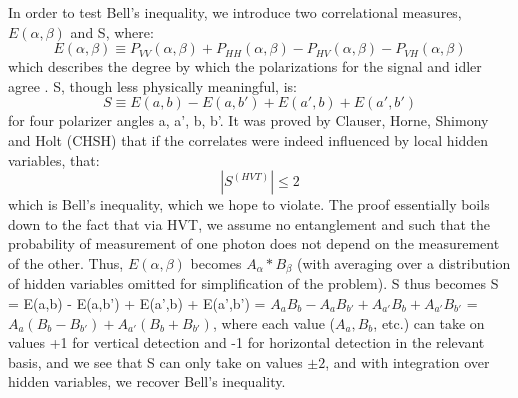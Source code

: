 \documentclass{article}
\begin{document}
    In order to test Bell's inequality, we introduce two correlational measures, $E(\alpha,\beta)$ and S, where:
    \begin{equation}
        E(\alpha,\beta) \equiv P_{VV}(\alpha,\beta) + P_{HH}(\alpha,\beta) - P_{HV}(\alpha,\beta) -  P_{VH}(\alpha,\beta)
    \end{equation}
    which describes the degree by which the polarizations for the signal and idler agree \cite{deh}. S, though less physically meaningful, is: 
    \begin{equation}
        S \equiv E(a,b) - E(a,b') + E(a',b) + E(a',b')
    \end{equation}
    for four polarizer angles a, a', b, b'. It was proved by Clauser, Horne, Shimony and Holt (CHSH) that if the correlates were indeed influenced by local hidden variables, that:
    \begin{equation}
        |S^{(HVT)}| \leq 2
    \end{equation}
    which is Bell's inequality, which we hope to violate. The proof essentially boils down to the fact that via HVT, we assume no entanglement and such that the probability of measurement of one photon does not depend on the measurement of the other. Thus, $E(\alpha,\beta)$ becomes $A_{\alpha}*B_{\beta}$ (with averaging over a distribution of hidden variables omitted for simplification of the problem). S thus becomes S = E(a,b) - E(a,b') + E(a',b) + E(a',b') = $A_a B_b - A_a B_{b'} + A_{a'} B_b + A_{a'} B_{b'}$ = $A_a( B_b - B_{b'}) + A_{a'}(B_b + B_{b'})$, where each value ($A_a, B_b$, etc.) can take on values +1 for vertical detection and -1 for horizontal detection in the relevant basis, and we see that S can only take on values $\pm 2$, and with integration over hidden variables, we recover Bell's inequality. \cite{bell}\cite{qie} %
    
\end{document}
